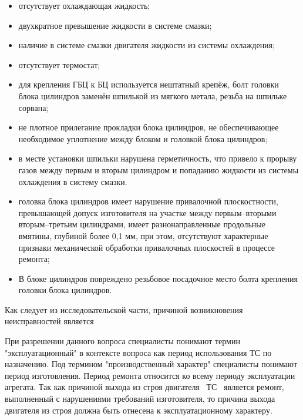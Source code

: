 \begin{itemize}
    \item 	отсутствует охлаждающая жидкость;
    \item   двухкратное превышение жидкости в системе смазки; 
    \item 	наличие в системе смазки двигателя жидкости из системы охлаждения;
    \item 	отсутствует термостат;
    \item 	для крепления ГБЦ к БЦ используется нештатный крепёж, болт головки блока цилиндров заменён шпилькой из мягкого метала, резьба 
    на шпильке сорвана;
    \item  не плотное прилегание прокладки блока цилиндров, не обеспечивающее необходимое уплотнение между блоком и головкой блока цилиндров;
    \item   в месте установки шпильки нарушена герметичность, что привело к  прорыву газов между первым и вторым цилиндром и попаданию жидкости из системы охлаждения в систему смазки. 
    \item 	головка блока цилиндров имеет нарушение привалочной плоскостности, превышающей допуск изготовителя  на участке между первым--вторыми вторым--третьим цилиндрами, имеет разнонаправленные продольные вмятины, глубиной более 0,1 мм, при этом, отсутствуют характерные признаки механической обработки привалочных плоскостей в процессе ремонта; 
    \item 	В блоке цилиндров повреждено резьбовое посадочное место болта крепления головки блока цилиндров. 
\end{itemize}



Как следует из исследовательской части, причиной возникновения неисправностей является 


При разрешении данного вопроса специалисты понимают термин "эксплуатационный" в контексте вопроса   как период использования ТС по назначению. Под термином "производственный характер" специалисты понимают период изготовления.  Период ремонта относится ко всему периоду эксплуатации агрегата.  Так как причиной выхода из строя двигателя  \, ТС \, является ремонт, выполненный с нарушениями требований изготовителя, то причина выхода двигателя из строя должна быть отнесена к эксплуатационному характеру.  


